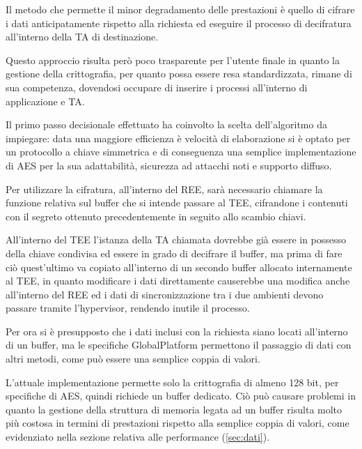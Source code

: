 \documentclass[12pt,italian]{report}
\begin{document}
	\bigbreak
	
	Il metodo che permette il minor degradamento delle prestazioni è quello di cifrare i dati anticipatamente rispetto alla richiesta ed eseguire il processo di decifratura all'interno della TA di destinazione. 
	
	Questo approccio risulta però poco trasparente per l'utente finale in quanto la gestione della crittografia, per quanto possa essere resa standardizzata, rimane di sua competenza, dovendosi occupare di inserire i processi all'interno di applicazione e TA. 
	
	\bigbreak 
	
	Il primo passo decisionale effettuato ha coinvolto la scelta dell'algoritmo da impiegare: data una maggiore efficienza è velocità di elaborazione si è optato per un protocollo a chiave simmetrica e di conseguenza una semplice implementazione di AES \cite{aes} per la sua adattabilità, sicurezza ad attacchi noti e supporto diffuso. 
	
	\bigbreak 
	
	Per utilizzare la cifratura, all'interno del REE, sarà necessario chiamare la funzione relativa sul buffer che si intende passare al TEE, cifrandone i contenuti con il segreto ottenuto precedentemente in seguito allo scambio chiavi.
	
	All'interno del TEE l'istanza della TA chiamata dovrebbe già essere in possesso della chiave condivisa ed essere in grado di decifrare il buffer, ma prima di fare ciò quest'ultimo va copiato all'interno di un secondo buffer allocato internamente al TEE, in quanto modificare i dati direttamente causerebbe una modifica anche all'interno del REE ed i dati di sincronizzazione tra i due ambienti devono passare tramite l'hypervisor, rendendo inutile il processo.
	
	\bigbreak
	
	Per ora si è presupposto che i dati inclusi con la richiesta siano locati all'interno di un buffer, ma le specifiche GlobalPlatform \cite{gp2020clientapi} permettono il passaggio di dati con altri metodi, come può essere una semplice coppia di valori.
	
	L'attuale implementazione permette solo la crittografia di almeno 128 bit, per specifiche di AES, quindi richiede un buffer dedicato. Ciò può causare problemi in quanto la gestione della struttura di memoria legata ad un buffer risulta molto più costosa in termini di prestazioni rispetto alla semplice coppia di valori, come evidenziato nella sezione relativa alle performance (\ref{sec:dati}).
	
\end{document}
